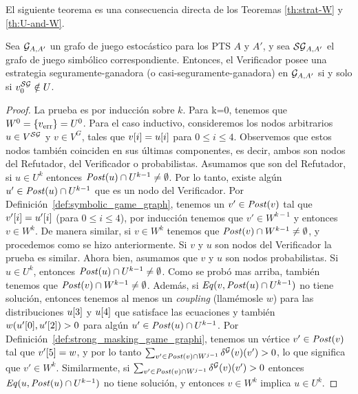 El siguiente teorema es una consecuencia directa de los Teoremas
\ref{th:strat-W} y \ref{th:U-and-W}.

\begin{theorem}
  Sea $\StochG_{A,A'}$ un grafo de juego estocástico para los PTS $A$
  y $A'$, y sea $\SymbG_{A,A'}$ el grafo de juego simbólico correspondiente.  Entonces, el Verificador posee una estrategia seguramente-ganadora (o casi-seguramente-ganadora) en
  $\StochG_{A,A'}$ si y solo si $v^\SymbG_0 \notin U$.
\end{theorem}

\noindent
\noindent
\begin{proof}  
La prueba es por inducción sobre $k$. Para k=0, tenemos que $W^0 = \{ \ErrorSt \} = U^0$. Para el caso inductivo, consideremos los nodos arbitrarios $u \in V^\SymbG$ y $v \in V^{G}$,
tales que $\pr{i}{v} = \pr{i}{u}$ para $0 \leq i \leq 4$. Observemos que estos nodos también coinciden en sus últimas componentes, es decir, ambos son nodos del Refutador, del Verificador o probabilistas. 
Asumamos que son del Refutador, si $u \in U^{k}$ entonces $\post(u) \cap U^{k-1} \neq \emptyset$. 
Por lo tanto, existe algún $u' \in \post(u) \cap U^{k-1}$ que es un nodo del Verificador.  Por Definición~\ref{def:symbolic_game_graph}, tenemos un $v' \in \post(v)$ tal que $\pr{i}{v'}=\pr{i}{u'}$ (para $0\leq i \leq 4$), por inducción tenemos que $v' \in W^{k-1}$ 
y entonces $v \in W^k$. 
De manera similar, si $v \in W^k$ tenemos que $\post(v) \cap W^{k-1} \neq \emptyset$, y procedemos como se hizo anteriormente. 
Si $v$ y $u$ son nodos del Verificador la prueba es similar.
Ahora bien, asumamos que $v$ y $u$ son nodos probabilistas. 
Si $u \in U^k$, entonces $\post(u) \cap U^{k-1} \neq \emptyset$. Como se probó mas arriba, también tenemos que  $\post(v) \cap W^{k-1} \neq \emptyset$. 
Además, si $\Eq(v, \post(u) \cap U^{k-1})$ no tiene solución, entonces tenemos al menos un \emph{coupling} (llamémosle $w$) para las distribuciones
$\pr{3}{u}$ y $\pr{4}{u}$ que satisface las ecuaciones y también $w(\pr{0}{u'},\pr{2}{u'})>0$ para algún $u' \in \post(u) \cap U^{k-1}$. 
Por Definición~\ref{def:strong_masking_game_graphi}, tenemos un vértice $v' \in \post(v)$ tal que $\pr{5}{v'}=w$, y por lo tanto $\sum_{v' \in \post(v) \cap W^{j-1}} \delta^\StochG(v)(v') >0$, lo que significa que $v' \in W^k$. 
Similarmente, si $\sum_{v' \in \post(v) \cap W^{j-1}} \delta^\StochG(v)(v') >0$  entonces $\Eq(u, \post(u) \cap U^{k-1})$ no tiene solución, y entonces
$v\in W^k$ implica $u \in U^k$.
\end{proof} \\
